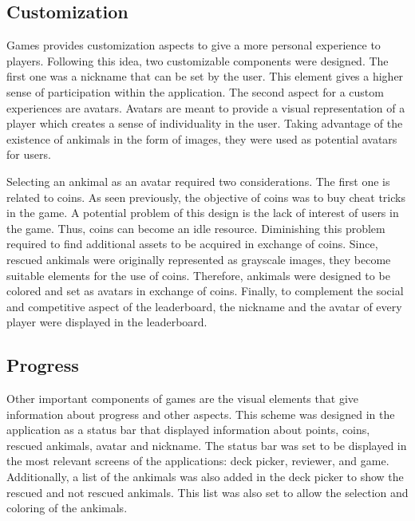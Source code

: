 \subsection{Customization}
Games provides customization aspects to give a more personal experience to players. Following this idea, two customizable components were designed. The first one was a nickname that can be set by the user. This element gives a higher sense of participation within the application. The second aspect for a custom experiences are avatars. Avatars are meant to provide a visual representation of a player which creates a sense of individuality in the user. Taking advantage of the existence of ankimals in the form of images, they were used as potential avatars for users.

Selecting an ankimal as an avatar required two considerations. The first one is related to coins. As seen previously, the objective of coins was to buy cheat tricks in the game. A potential problem of this design is the lack of interest of users in the game. Thus, coins can become an idle resource. Diminishing this problem required to find additional assets to be acquired in exchange of coins. Since, rescued ankimals were originally represented as grayscale images, they become suitable elements for the use of coins. Therefore, ankimals were designed to be colored and set as avatars in exchange of coins. Finally, to complement the social and competitive aspect of the leaderboard, the nickname and the avatar of every player were displayed in the leaderboard.

\subsection{Progress}
Other important components of games are the visual elements that give information about progress and other aspects. This scheme was designed in the application as a status bar that displayed information about points, coins, rescued ankimals, avatar and nickname. The status bar was set to be displayed in the most relevant screens of the applications: deck picker, reviewer, and game. Additionally, a list of the ankimals was also added in the deck picker to show the rescued and not rescued ankimals. This list was also set to allow the selection and coloring of the ankimals.

